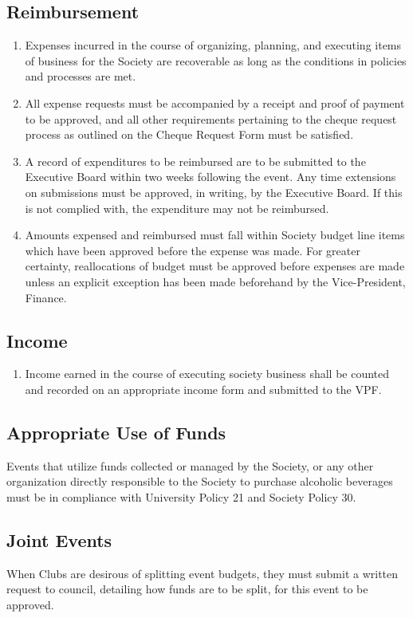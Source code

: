 \subsection{Reimbursement}
\begin{enumerate}
\item Expenses incurred in the course of organizing, planning, and executing items of business for the Society are recoverable as long as the conditions in policies and processes are met.
\item All expense requests must be accompanied by a receipt and proof of payment to be approved, and all other requirements pertaining to the cheque request process as outlined on the Cheque Request Form must be satisfied.
\item A record of expenditures to be reimbursed are to be submitted to the Executive Board within two weeks following the event. Any time extensions on submissions must be approved, in writing, by the Executive Board. If this is not complied with, the expenditure may not be reimbursed.
\item Amounts expensed and reimbursed must fall within Society budget line items which have been approved before the expense was made. For greater certainty, reallocations of budget must be approved before expenses are made unless an explicit exception has been made beforehand by the Vice-President, Finance.
\end{enumerate}

\subsection{Income}
\begin{enumerate}
\item Income earned in the course of executing society business shall be counted and recorded on an appropriate income form and submitted to the VPF.
\end{enumerate}

\subsection{Appropriate Use of Funds}
Events that utilize funds collected or managed by the Society, or any other organization directly responsible to the Society to purchase alcoholic beverages must be in compliance with University Policy 21 and Society Policy 30.

\subsection{Joint Events}

When Clubs are desirous of splitting event budgets, they must submit a written request to council, detailing how funds are to be split, for this event to be approved.